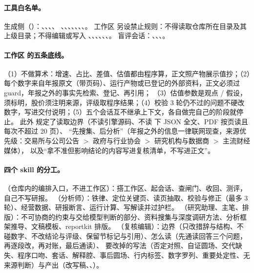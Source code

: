 \paragraph{工具白名单。}
\begin{sloppypar}
生成侧（）：、、、、
、、、、、、、。
工作区  另设禁止规则：不得读取仓库所在目录及其上级目录；不得编辑或写入 、、、、、、。
盲评会话：、、、。
\end{sloppypar}

\paragraph{工作区  的五条底线。}
（1）不做算术：增速、占比、差值、估值都由程序算，正文照产物展示值抄；（2）每个数字来自年报原文（带页码）、运行产物或已登记的外部资料，正文必须过 guard，年报之外的事实先检索、登记、再引用；
（3）估值参数是观点 / 假设，须标明，股价须注明来源，评级取程序结果；（4）校验 3 轮仍不过的问题不硬改数字，写进交付说明；（5）五个会话互不继承上下文，各自做完自己的阶段就停止。
此外  规定了读取边界（不读引擎源码、不读  下 JSON 全文、PDF 按页读且每次不超过 20 页）、
“先搜集、后分析”（年报之外的信息一律联网现查，来源优先级：交易所与公司公告 $>$ 政府与行业协会 $>$ 研究机构与数据商 $>$ 主流财经媒体），
以及“拿不准但影响结论的内容写进复核清单，不写进正文”。

\paragraph{四个 skill 的分工。}
（仓库内的编排入口，不进工作区）：搭工作区、起会话、查闸门、收回、测评，自己不写研报。
（分析师）：铁律、定位关键页、读页抽取、校验与修正（最多 3 轮）、经营数据、研报断言、运行计算、写解读并过护栏。
（研究助理、主笔、排版）：不可协商的约束与交给模型判断的部分、资料搜集与深度调研方法、分析框架推导、文稿模板、reportkit 排版。
（复核编辑）：边界（只改措辞与结构、不碰数字、不改结论与评级、保留节标记与引用）、怎么读（先通读回答三个问题，再逐段改，再对账，最后通读）、
要改掉的写法（否定对照、自证圆场、交代缺失、程序口吻、套话、解释腔、事后圆场、行内标签、数字罗列、重要处定性、无来源判断）与产出（改写稿、、）。

